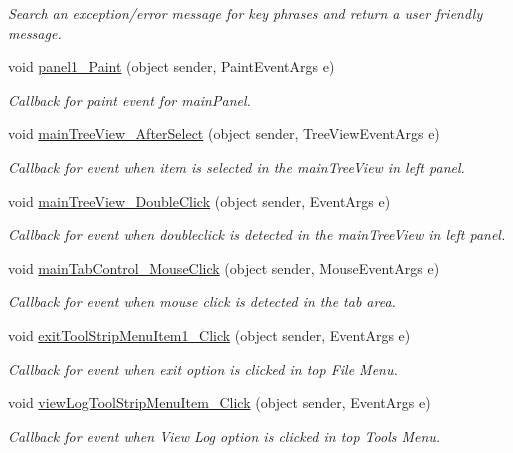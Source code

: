 \begin{DoxyCompactItemize}
\begin{DoxyCompactList}\small\item\em Search an exception/error message for key phrases and return a user friendly message. \item\end{DoxyCompactList}\item 
void \hyperlink{class_ias_pbx_config_1_1_main_form_a220eaac9b10c90352a62fcb1eea7cfb1}{panel1\_\-Paint} (object sender, PaintEventArgs e)
\begin{DoxyCompactList}\small\item\em Callback for paint event for mainPanel. \item\end{DoxyCompactList}\item 
void \hyperlink{class_ias_pbx_config_1_1_main_form_a4f46ed49282adeaa8154639534a2ec55}{mainTreeView\_\-AfterSelect} (object sender, TreeViewEventArgs e)
\begin{DoxyCompactList}\small\item\em Callback for event when item is selected in the mainTreeView in left panel. \item\end{DoxyCompactList}\item 
void \hyperlink{class_ias_pbx_config_1_1_main_form_ae06266f74a2fe3984a178d3a036cc434}{mainTreeView\_\-DoubleClick} (object sender, EventArgs e)
\begin{DoxyCompactList}\small\item\em Callback for event when doubleclick is detected in the mainTreeView in left panel. \item\end{DoxyCompactList}\item 
void \hyperlink{class_ias_pbx_config_1_1_main_form_a3b34ad5c46cb2005f92d87544f5d6a0d}{mainTabControl\_\-MouseClick} (object sender, MouseEventArgs e)
\begin{DoxyCompactList}\small\item\em Callback for event when mouse click is detected in the tab area. \item\end{DoxyCompactList}\item 
void \hyperlink{class_ias_pbx_config_1_1_main_form_aef7b05da6bcc8fe3038122275b665ccf}{exitToolStripMenuItem1\_\-Click} (object sender, EventArgs e)
\begin{DoxyCompactList}\small\item\em Callback for event when exit option is clicked in top File Menu. \item\end{DoxyCompactList}\item 
void \hyperlink{class_ias_pbx_config_1_1_main_form_aa6699db5558f8792d3d88313a456d423}{viewLogToolStripMenuItem\_\-Click} (object sender, EventArgs e)
\begin{DoxyCompactList}\small\item\em Callback for event when View Log option is clicked in top Tools Menu. \item\end{DoxyCompactList}\end{DoxyCompactItemize}
